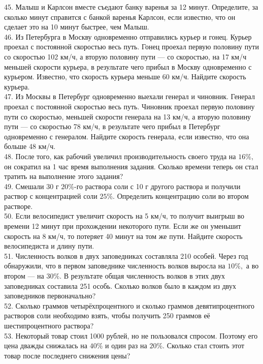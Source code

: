 \documentclass[12pt]{article}
\begin{document}
45. Малыш и Карлсон вместе съедают банку варенья за 12 минут. Определите, за сколько минут справится с банкой варенья Карлсон, если известно, что он сделает это на 10 минут быстрее, чем Малыш.\\
46. Из Петербурга в Москву одновременно отправились курьер и гонец. Курьер проехал с постоянной скоростью весь путь. Гонец проехал первую половину пути со скоростью 102 км/ч, а вторую половину пути --- со скоростью, на 17 км/ч меньшей скорости курьера, в результате чего прибыл в Москву одновременно с курьером. Известно, что скорость курьера меньше 60 км/ч. Найдите скорость курьера.\\
47. Из Москвы в Петербург одновременно выехали генерал и чиновник. Генерал проехал с постоянной скоростью весь путь. Чиновник проехал первую половину пути со скоростью, меньшей скорости генерала на 13 км/ч, а вторую половину пути --- со скоростью 78 км/ч, в результате чего прибыл в Петербург одновременно с генералом. Найдите скорость генерала, если известно, что она больше 48 км/ч.\\
48. После того, как рабочий увеличил производительность своего труда на $16\%,$ он сократил на 1 час время выполнения задания. Сколько времени теперь он стал тратить на выполнение этого задания?\\
49. Смешали 30 г $20\%$-го раствора соли с 10 г другого раствора и получили раствор с концентрацией соли $25\%.$ Определить концентрацию соли во втором растворе.\\
50. Если велосипедист увеличит скорость на 5 км/ч, то получит выигрыш во времени 12 минут при прохождении некоторого пути. Если же он уменьшит скорость на 8 км/ч, то потеряет 40 минут на том же пути. Найдите скорость велосипедиста и длину пути.\\
51. Численность волков в двух заповедниках составляла 210 особей. Через год обнаружили, что в первом заповеднике численность волков выросла на $10\%,$ а во втором --- на $30\%.$ В результате общая численность волков в этих двух заповедниках составила 251 особь. Сколько волков было в каждом из двух заповедников первоначально?\\
52. Сколько граммов четырёхпроцентного и сколько граммов девятипроцентного растворов соли необходимо взять, чтобы получить 250 граммов её шестипроцентного раствора?\\
53. Некоторый товар стоил 1000 рублей, но не пользовался спросом. Поэтому его цена дважды снижалась на $40\%$ и один раз на $20\%.$ Сколько стал стоить этот товар после последнего снижения цены?\\
\end{document}
